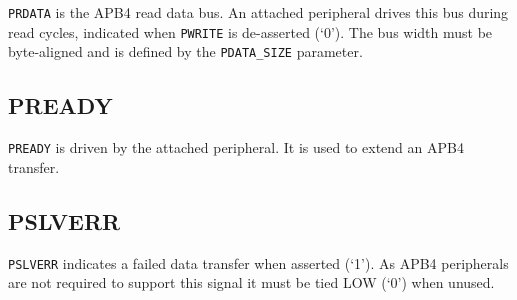 \texttt{PRDATA} is the APB4 read data bus. An attached peripheral drives this bus
during read cycles, indicated when \texttt{PWRITE} is de-asserted (`0'). The bus
width must be byte-aligned and is defined by the \texttt{PDATA\_SIZE} parameter.

\subsection{PREADY}\label{pready}

\texttt{PREADY} is driven by the attached peripheral. It is used to extend an
APB4 transfer.

\subsection{PSLVERR}\label{pslverr}

\texttt{PSLVERR} indicates a failed data transfer when asserted (`1'). As APB4
peripherals are not required to support this signal it must be tied LOW
(`0') when unused.

